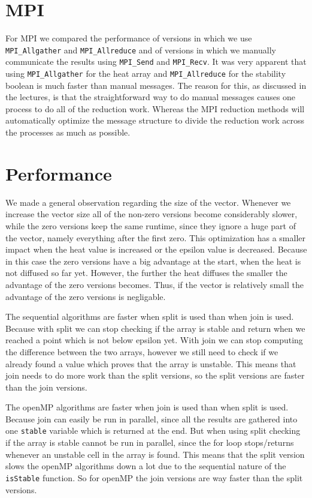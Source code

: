 \documentclass[a4paper]{article}
\begin{document}
\section{MPI}
For MPI we compared the performance of versions in which we use \texttt{MPI\_Allgather}
and \texttt{MPI\_Allreduce} and of versions in which we manually communicate the results using \texttt{MPI\_Send} and \texttt{MPI\_Recv}. It was very apparent that using \texttt{MPI\_Allgather} for the heat array and \texttt{MPI\_Allreduce} for the stability boolean is much faster than manual messages. The reason for this, as discussed in the lectures, is that the straightforward way to do manual messages causes one process to do all of the reduction work. Whereas the MPI reduction methods will automatically optimize the message structure to divide the reduction work across the processes as much as possible.


\section{Performance}
We made a general observation regarding the size of the vector. Whenever we increase the vector size all of the non-zero versions become considerably slower, while the zero versions keep the same runtime, since they ignore a huge part of the vector, namely everything after the first zero. This optimization has a smaller impact when the heat value is increased or the epsilon value is decreased. Because in this case the zero versions have a big advantage at the start, when the heat is not diffused so far yet. However, the further the heat diffuses the smaller the advantage of the zero versions becomes. Thus, if the vector is relatively small the advantage of the zero versions is negligable.

The sequential algorithms are faster when split is used than when join is used. Because with split we can stop checking if the array is stable and return when we reached a point which is not below epsilon yet. With join we can stop computing the difference between the two arrays, however we still need to check if we already found a value which proves that the array is unstable. This means that join needs to do more work than the split versions, so the split versions are faster than the join versions.

The openMP algorithms are faster when join is used than when split is used. Because join can easily be run in parallel, since all the results are gathered into one \texttt{stable} variable which is returned at the end. But when using split checking if the array is stable cannot be run in parallel, since the for loop stops/returns whenever an unstable cell in the array is found. This means that the split version slows the openMP algorithms down a lot due to the sequential nature of the \texttt{isStable} function. So for openMP the join versions are way faster than the split versions.
\end{document}
